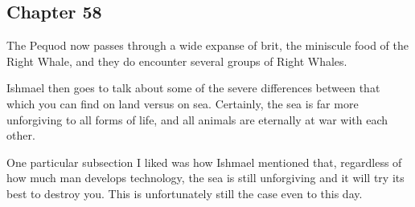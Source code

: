 \subsection{Chapter 58}

The Pequod now passes through a wide expanse of brit, the miniscule food of the
Right Whale, and they do encounter several groups of Right Whales.

Ishmael then goes to talk about some of the severe differences between that
which you can find on land versus on sea. Certainly, the sea is far more
unforgiving to all forms of life, and all animals are eternally at war with
each other.

One particular subsection I liked was how Ishmael mentioned that, regardless of
how much man develops technology, the sea is still unforgiving and it will try
its best to destroy you. This is unfortunately still the case even to this day.
